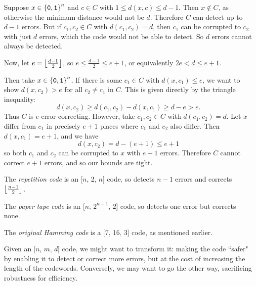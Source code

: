 \documentclass{article}
\begin{document}
\begin{prf}
    Suppose $x \in \left\lbrace \texttt{0}, \texttt{1} \right\rbrace^n$ and $c \in C$
    with $1 \leq d(x, c) \leq d-1$.
    Then $x \notin C$,
    as otherwise the minimum distance would not be $d$.
    Therefore $C$ can detect up to $d-1$ errors.
    But if $c_1, c_2 \in C$ with $d(c_1, c_2) = d$,
    then $c_1$ can be corrupted to $c_2$ with just $d$ errors,
    which the code would not be able to detect.
    So $d$ errors cannot always be detected.
    
    Now, let $e = \left\lfloor\frac{d-1}{2}\right\rfloor$,
    so $e \leq \frac{d-1}{2} \leq e+1$,
    or equivalently $2e < d \leq e+1$.
    
    Then take $x \in \left\lbrace \texttt{0}, \texttt{1} \right\rbrace^n$.
    If there is some $c_1 \in C$ with $d(x, c_1) \leq e$,
    we want to show $d(x, c_2) > e$ for all $c_2 \neq c_1$ in $C$.
    This is given directly by the triangle inequality:
    \[
	d(x, c_2) \geq d(c_1, c_2) - d(x, c_1) \geq d-e > e.
	\]
	Thus $C$ is $e$-error correcting.
	However, take $c_1, c_2 \in C$ with $d(c_1, c_2) = d$.
	Let $x$ differ from $c_1$ in precisely $e+1$ places
	where $c_1$ and $c_2$ also differ.
	Then $d(x, c_1) = e+1$, and we have
	\[
	d(x, c_2) = d - (e+1) \leq e+1
	\]
	so both $c_1$ and $c_2$ can be corrupted to $x$ with $e+1$ errors.
	Therefore $C$ cannot correct $e+1$ errors, and so our bounds are tight.
\end{prf}

\begin{corollary}
    The \textit{repetition code} is an [$n$, 2, $n$] code,
    so detects $n-1$ errors and corrects $\left\lfloor\frac{n-1}{2}\right\rfloor$.
\end{corollary}

\begin{corollary}
    The \textit{paper tape code} is an [$n$, $2^{n-1}$, $2$] code,
    so detects one error but corrects none.
\end{corollary}

\begin{corollary}
    The \textit{original Hamming code} is a [7, 16, 3] code,
    as mentioned earlier.
\end{corollary}

Given an [$n$, $m$, $d$] code, we might want to transform it:
making the code ``safer" by enabling it to detect or correct more errors,
but at the cost of increasing the length of the codewords.
Conversely, we may want to go the other way, sacrificing robustness for efficiency.
\end{document}
